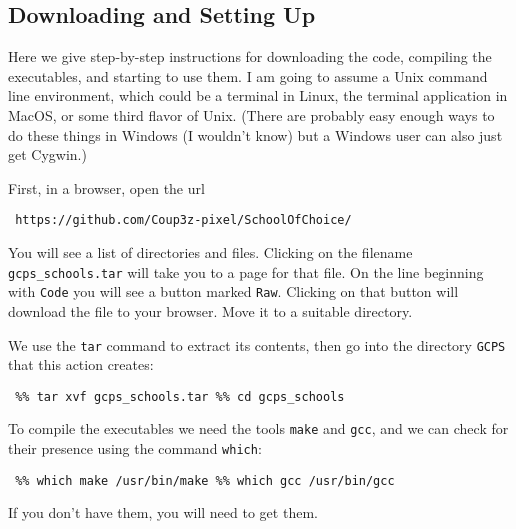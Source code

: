 \documentclass[12pt]{article}
\theoremstyle{definition}
\begin{document}
\begin{appendix}

\section{Downloading and Setting Up} \label{app:DownloadInstall}

Here we give step-by-step instructions for downloading the code,
compiling the executables, and starting to use them.  I am going to
assume a Unix command line environment, which could be a terminal in
Linux, the terminal application in MacOS, or some third flavor of
Unix.  (There are probably easy enough ways to do these things in
Windows (I wouldn't know) but a Windows user can also just get
Cygwin.)

First, in a browser, open the url
\begin{obeylines}
  \texttt{
    https://github.com/Coup3z-pixel/SchoolOfChoice/
    }
\end{obeylines}

\bigskip \noindent You will see a list of directories and files.
Clicking on the filename \texttt{gcps\_schools.tar} will take you to a
page for that file.  On the line beginning with \texttt{Code} you will
see a button marked \texttt{Raw}.  Clicking on that button will
download the file to your browser.  Move it to a suitable directory.

We use the \texttt{tar} command to
extract its contents, then go into the directory \texttt{GCPS} that this action creates:
\begin{obeylines}
  \texttt{
    \%\% tar xvf gcps\_schools.tar
    \%\% cd gcps\_schools
    }
\end{obeylines}
\bigskip

To compile the executables we need the tools \texttt{make} and
\texttt{gcc}, and we can check for their presence using
the command \texttt{which}:
\begin{obeylines}
  \texttt{
    \%\% which make
    /usr/bin/make
    \%\% which gcc
    /usr/bin/gcc
    }
\end{obeylines}
\bigskip \noindent
If you don't have them, you will need to get them.


\end{appendix}
\end{document}
